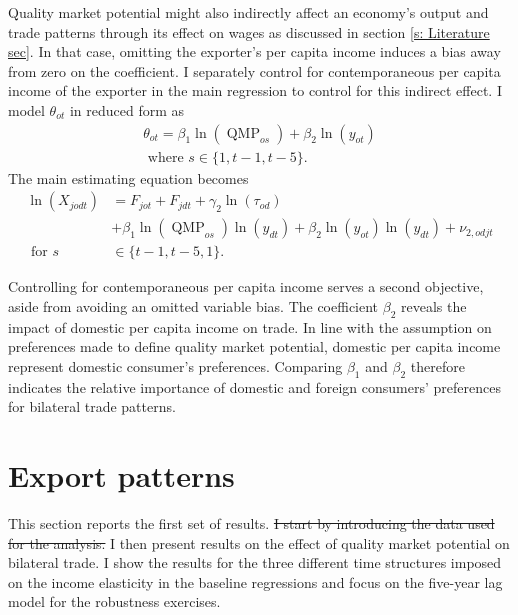 \documentclass[12pt,a4paper,oneside,times]{article}   	%
\DeclareMathOperator{\MP}{QMP}
\begin{document}
Quality market potential might also indirectly affect an economy's output and trade patterns through its effect on wages as discussed in section \ref{s: Literature sec}. %
In that case, omitting the exporter's per capita income induces a bias away from zero on the coefficient. I separately control for contemporaneous per capita income of the exporter in the main regression to control for this indirect effect.  I model $\theta_{ot}$ in reduced form as
\begin{align}\label{eq: theta ass}
\theta_{ot}
=  \beta_1\ln(\MP_{os}) + \beta_2\ln(y_{ot}) \\ \text{ where } s \in \{1,t-1,t-5\} \nonumber .
\end{align}
The main estimating equation becomes
\begin{align}\label{eq:estimating equation robust}
\ln(X_{jodt})
&= F_{jot}+ F_{jdt} + \gamma_{2}\ln(\tau_{od}) \nonumber \\ &+ \beta_1\ln(\MP_{os})\ln(y_{dt}) + \beta_2\ln(y_{ot})\ln(y_{dt}) + \nu_{2,odjt} \\
\text{ for } s &\in\{t-1,t-5,1\}  \nonumber .
\end{align}

Controlling for contemporaneous per capita income serves a second objective, aside from avoiding an omitted variable bias. The coefficient $\beta_2$ reveals the impact of domestic per capita income on trade. In line with the assumption on preferences made to define quality market potential, domestic per capita income represent domestic consumer's preferences. Comparing $\beta_1$ and $\beta_2$ therefore indicates the relative importance of domestic and foreign consumers' preferences for bilateral trade patterns.  

\section{Export patterns}\label{s: MA and exports}
This section reports the first set of results. \sout{I start by introducing the data used for the analysis.} I then present  results on the effect of quality market potential on bilateral trade. I show the results for the three different time structures imposed on the income elasticity in the baseline regressions and focus on the five-year lag model for the robustness exercises.
\end{document}

